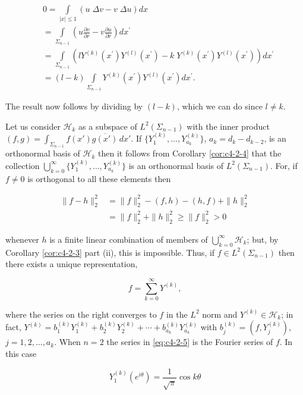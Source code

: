 \[
\begin{aligned}&0=\int\limits_{|x|\leq1}(u\;\Delta v-v\;\Delta u)dx\\&=\int\limits_{\Sigma_{n-1}}\left(u\frac{\partial v}{\partial r}-v\frac{\partial u}{\partial r}\right)dx^{\prime}\\&=\int\limits_{\Sigma_{n-1}}\left(lY^{(k)}(x^{\prime})Y^{(l)}(x^{\prime})-k\;Y^{(k)}(x^{\prime})Y^{(l)}(x^{\prime})\right)dx^{\prime}\\&=\left(l-k\right)\int\limits_{\Sigma_{n-1}}Y^{(k)}(x^{\prime})Y^{(l)}(x^{\prime})dx^{\prime}.\end{aligned}
\]

The result now follows by dividing by $(l - k)$, which we can do since $l \neq k$.

Let us consider $\mathcal{H}_k$ as a subspace of $L^2(\Sigma_{n-1})$ with the inner product $(f, g) = \int_{\Sigma_{n-1}} f(x') \overline{g(x')} \, dx'$. If $\{Y_1^{(k)}, \ldots, Y_{a_k}^{(k)}\}$, $a_k = d_k - d_{k-2}$, is an orthonormal basis of $\mathcal{H}_k$ then it follows from Corollary \ref{cor:c4-2-4} that the collection $\bigcup_{k=0}^{\infty} \{Y_1^{(k)}, \ldots, Y_{a_k}^{(k)}\}$ is an orthonormal basis of $L^2(\Sigma_{n-1})$. For, if $f \neq 0$ is orthogonal to all these elements then

\[
\begin{aligned}\|f-h\|_{2}^{2}&=\|f\|_{2}^{2}-(f,h)-(h,f)+\|h\|_{2}^{2}\\&=\|f\|_{2}^{2}+\|h\|_{2}^{2}\geq\|f\|_{2}^{2}>0\end{aligned}
\]

whenever $h$ is a finite linear combination of members of $\bigcup_{k=0}^{\infty}\mathcal{H}_k$; but, by Corollary \ref{cor:c4-2-3} part (ii), this is impossible. Thus, if $f\in L^2(\Sigma_{n-1})$ then there exists a unique representation,

\begin{equation}\label{eq:c4-2-5}
f=\sum_{k=0}^{\infty}Y^{(k)},
\end{equation}

where the series on the right converges to $f$ in the $L^2$ norm and $Y^{(k)} \in \mathcal{H}_k$; in fact, $Y^{(k)} = b_1^{(k)} Y_1^{(k)} + b_2^{(k)} Y_2^{(k)} + \cdots + b_{a_k}^{(k)} Y_{a_k}^{(k)}$ with $b_j^{(k)} = (f, Y_j^{(k)})$, $j = 1, 2, \ldots, a_k$. When $n = 2$ the series in \eqref{eq:c4-2-5} is the Fourier series of $f$. In this case

\[
Y_{1}^{(k)}(e^{i\theta})=\frac{1}{\sqrt{\pi}}\cos k\theta
\]

